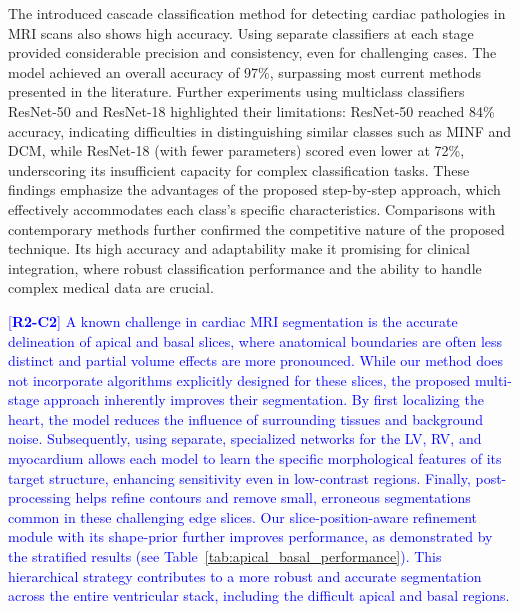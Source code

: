 \documentclass[fleqn,10pt]{wlscirep}
\newcommand{\revtag}[2]{[\textbf{R#1-C#2}]}
\newcommand{\Rtwo}[1]{\textcolor{blue}{#1}}
\begin{document}
The introduced cascade classification method for detecting cardiac pathologies in MRI scans also shows high accuracy. Using separate classifiers at each stage provided considerable precision and consistency, even for challenging cases. The model achieved an overall accuracy of 97\%, surpassing most current methods presented in the literature. Further experiments using multiclass classifiers ResNet-50 and ResNet-18 highlighted their limitations: ResNet-50 reached 84\% accuracy, indicating difficulties in distinguishing similar classes such as MINF and DCM, while ResNet-18 (with fewer parameters) scored even lower at 72\%, underscoring its insufficient capacity for complex classification tasks. These findings emphasize the advantages of the proposed step-by-step approach, which effectively accommodates each class's specific characteristics. Comparisons with contemporary methods further confirmed the competitive nature of the proposed technique. Its high accuracy and adaptability make it promising for clinical integration, where robust classification performance and the ability to handle complex medical data are crucial.

\Rtwo{\revtag{2}{2} A known challenge in cardiac MRI segmentation is the accurate delineation of apical and basal slices, where anatomical boundaries are often less distinct and partial volume effects are more pronounced. While our method does not incorporate algorithms explicitly designed for these slices, the proposed multi-stage approach inherently improves their segmentation. By first localizing the heart, the model reduces the influence of surrounding tissues and background noise. Subsequently, using separate, specialized networks for the LV, RV, and myocardium allows each model to learn the specific morphological features of its target structure, enhancing sensitivity even in low-contrast regions. Finally, post-processing helps refine contours and remove small, erroneous segmentations common in these challenging edge slices. Our slice-position-aware refinement module with its shape-prior further improves performance, as demonstrated by the stratified results (see Table~\ref{tab:apical_basal_performance}). This hierarchical strategy contributes to a more robust and accurate segmentation across the entire ventricular stack, including the difficult apical and basal regions.}
\end{document}
